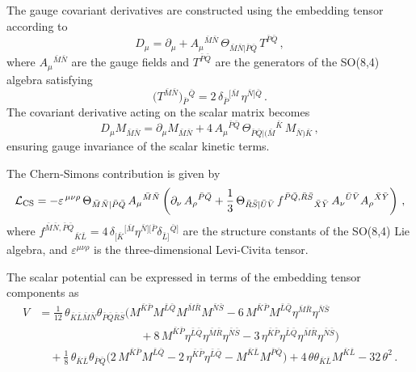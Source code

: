 \documentclass[11pt]{article}
\newcommand{\bK}{{\bar{K}}}
\newcommand{\bL}{{\bar{L}}}
\newcommand{\bM}{{\bar{M}}}
\newcommand{\bN}{{\bar{N}}}
\newcommand{\bP}{{\bar{P}}}
\newcommand{\bQ}{{\bar{Q}}}
\newcommand{\bR}{{\bar{R}}}
\newcommand{\bS}{{\bar{S}}}
\begin{document}
The gauge covariant derivatives are constructed using the embedding tensor according to
%
\begin{equation}
	D_\mu =\partial_\mu + A_\mu{}^{\bM\bN}\,\Theta_{\bM\bN\vert\bP\bQ}\, T^{\bP\bQ}\,,
\end{equation}
%
where $A_\mu{}^{\bM\bN}$ are the gauge fields and $T^{\bP\bQ}$ are the generators of the SO(8,4) algebra satisfying
%
\begin{equation} \label{eq:so84gen_rephrased}
	\big(T^{\bar M\bar N}\big){}_{\bar P}{}^{\bar Q} = 2\,\delta_{\bar P}{}^{[\bar M}\,\eta^{\bar N]\bar Q}\,.
\end{equation}
%
The covariant derivative acting on the scalar matrix becomes
%
\begin{equation}
	D_\mu M_{\bM\bN}=\partial_\mu M_{\bM\bN}+4\,A_\mu{}^{\bP\bQ}\,\Theta_{\bP\bQ\vert(\bM}{}^{\bK}\, M_{\bN)\bK}\,,
\end{equation}
%
ensuring gauge invariance of the scalar kinetic terms.

The Chern-Simons contribution is given by
%
\begin{equation}
	{\cal L}_{\rm CS}= -\varepsilon^{\,\mu\nu\rho}\,\Theta_{\bar M\bar N|\bar P\bar Q}\,A_{\mu}{}^{\bar M\bar N}\left(\partial_{\nu}\,A_{\rho}{}^{\bar P\bar Q}  + \frac{1}{3}\, \Theta_{\bar R\bar S|\bar U\bar V}\,f^{\bar P\bar Q,\bar R\bar S}{}_{\bar X\bar Y}\, A_{\nu}{}^{\bar U\bar V} A_{\rho}{}^{\bar X\bar Y} \right)\,,
\end{equation}
%
where $f^{\bar M\bar N,\bar P\bar Q}{}_{\bar K\bar L} = 4\,\delta_{[\bar K}{}^{[\bar M}\eta^{\bar N][\bar P}\delta_{\bar L]}{}^{\bar Q]}$ are the structure constants of the SO(8,4) Lie algebra, and $\varepsilon^{\mu\nu\rho}$ is the three-dimensional Levi-Civita tensor.

The scalar potential can be expressed in terms of the embedding tensor components as
%
{\setlength\arraycolsep{1.2pt}
	\begin{equation}	\label{eq: scalarpot_rephrased}
		\begin{aligned}
			V	&=	\frac1{12}\,\theta_{\bK\bL\bM\bN}\theta_{\bP\bQ\bR\bS}\Big(M^{\bK\bP}M^{\bL\bQ}M^{\bM\bR}M^{\bN\bS}-6\,M^{\bK\bP}M^{\bL\bQ}\eta^{\bM\bR}\eta^{\bN\bS}\\
			&\qquad\qquad\qquad\qquad\quad+8\,M^{\bK\bP}\eta^{\bL\bQ}\eta^{\bM\bR}\eta^{\bN\bS}-3\,\eta^{\bK\bP}\eta^{\bL\bQ}\eta^{\bM\bR}\eta^{\bN\bS}\Big)\\
			&\quad +\frac1{8}\,\theta_{\bK\bL}\theta_{\bP\bQ}\Big(2\,M^{\bK\bP}M^{\bL\bQ}-2\,\eta^{\bK\bP}\eta^{\bL\bQ}-M^{\bK\bL}M^{\bP\bQ}\Big)+4\,\theta\theta_{\bK\bL}M^{\bK\bL}-32\,\theta^2\,.
		\end{aligned}
	\end{equation}
}
\end{document}
